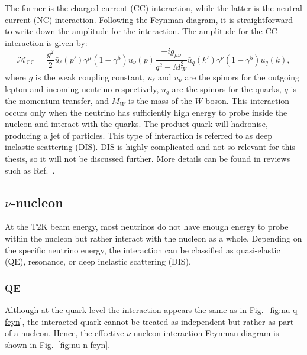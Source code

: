 The former is the charged current (CC) interaction, while the latter is the neutral current (NC) interaction.
Following the Feynman diagram, it is straightforward to write down the amplitude for the interaction.
The amplitude for the CC interaction is given by:
\begin{equation}
  \mathcal{M}_{\text{CC}} = \frac{g^2}{2} \bar{u}_\ell(p') \gamma^\mu (1 - \gamma^5) u_\nu(p) \frac{-i g_{\mu\nu}}{q^2 - M_W^2} \bar{u}_q(k') \gamma^\nu (1 - \gamma^5) u_q(k),
\end{equation}
where $g$ is the weak coupling constant, $u_\ell$ and $u_\nu$ are the spinors for the outgoing lepton and incoming neutrino respectively, $u_q$ are the spinors for the quarks, $q$ is the momentum transfer, and $M_W$ is the mass of the $W$ boson.
This interaction occurs only when the neutrino has sufficiently high energy to probe inside the nucleon and interact with the quarks.
The product quark will hadronise, producing a jet of particles.
This type of interaction is referred to as deep inelastic scattering (DIS).
DIS is highly complicated and not so relevant for this thesis, so it will not be discussed further.
More details can be found in reviews such as Ref.~\cite{}.

\subsection{$\nu$-nucleon}
At the T2K beam energy, most neutrinos do not have enough energy to probe within the nucleon but rather interact with the nucleon as a whole.
Depending on the specific neutrino energy, the interaction can be classified as quasi-elastic (QE), resonance, or deep inelastic scattering (DIS).

\subsubsection{QE}
Although at the quark level the interaction appears the same as in Fig.~\ref{fig:nu-q-feyn}, the interacted quark cannot be treated as independent but rather as part of a nucleon.
Hence, the effective $\nu$-nucleon interaction Feynman diagram is shown in Fig.~\ref{fig:nu-n-feyn}.

